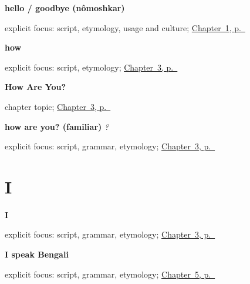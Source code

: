 \noindent\begin{minipage}[t]{\linewidth}
\raggedright
\textbf{hello / goodbye (nômoshkar)}\enspace\emph{}\par
\footnotesize explicit focus: script, etymology, usage and culture; \hyperref[ch:greetings]{Chapter~1, p.~\pageref*{ch:greetings}}
\end{minipage}\par\smallskip

\noindent\begin{minipage}[t]{\linewidth}
\raggedright
\textbf{how}\enspace\emph{}\par
\footnotesize explicit focus: script, etymology; \hyperref[ch:responding]{Chapter~3, p.~\pageref*{ch:responding}}
\end{minipage}\par\smallskip

\noindent\begin{minipage}[t]{\linewidth}
\raggedright
\textbf{How Are You?}\par
\footnotesize chapter topic; \hyperref[ch:responding]{Chapter~3, p.~\pageref*{ch:responding}}
\end{minipage}\par\smallskip

\noindent\begin{minipage}[t]{\linewidth}
\raggedright
\textbf{how are you? (familiar)}\enspace\emph{  ?}\par
\footnotesize explicit focus: script, grammar, etymology; \hyperref[ch:responding]{Chapter~3, p.~\pageref*{ch:responding}}
\end{minipage}\par\smallskip

\section*{I}

\noindent\begin{minipage}[t]{\linewidth}
\raggedright
\textbf{I}\enspace\emph{}\par
\footnotesize explicit focus: script, grammar, etymology; \hyperref[ch:responding]{Chapter~3, p.~\pageref*{ch:responding}}
\end{minipage}\par\smallskip

\noindent\begin{minipage}[t]{\linewidth}
\raggedright
\textbf{I speak Bengali}\enspace\emph{  }\par
\footnotesize explicit focus: script, grammar, etymology; \hyperref[ch:first-verbs]{Chapter~5, p.~\pageref*{ch:first-verbs}}
\end{minipage}\par\smallskip

